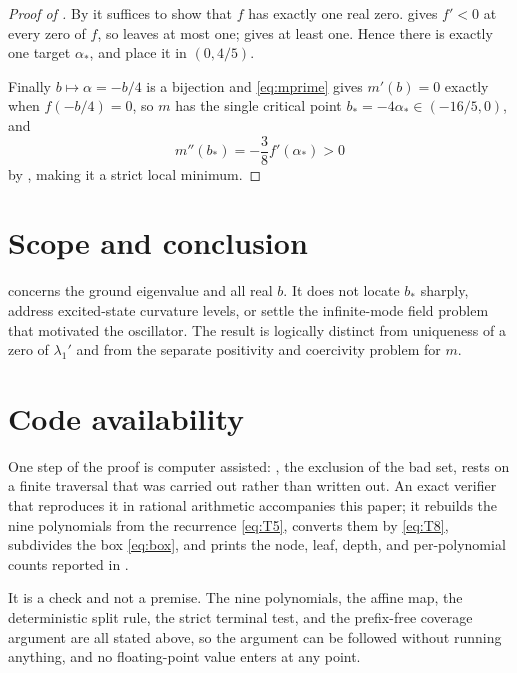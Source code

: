 \documentclass[11pt,reqno]{amsart}
\theoremstyle{plain}
\theoremstyle{definition}
\theoremstyle{remark}
\numberwithin{equation}{section}
\begin{document}
\begin{proof}[Proof of ]
  By  it suffices to show that $f$ has exactly one real
  zero.  gives $f'<0$ at every zero of $f$, so
   leaves at most one;  gives at
  least one. Hence there is exactly one target $\alpha_*$, and
   place it in $(0,4/5)$.

  Finally $b\mapsto\alpha=-b/4$ is a bijection and \eqref{eq:mprime} gives
  $m'(b)=0$ exactly when $f(-b/4)=0$, so $m$ has the single critical point
  $b_*=-4\alpha_*\in(-16/5,0)$, and
  \begin{equation*}
    m''(b_*)=-\frac38f'(\alpha_*)>0
  \end{equation*}
  by , making it a strict local minimum.
\end{proof}

\section{Scope and conclusion}

 concerns the ground eigenvalue and all real $b$.  It does
not locate $b_*$ sharply, address excited-state curvature levels, or settle
the infinite-mode field problem that motivated the oscillator.  The result
is logically distinct from uniqueness of a zero of $\lambda_1'$ and from
the separate positivity and coercivity problem for $m$.

\section*{Code availability}

One step of the proof is computer assisted: , the
exclusion of the bad set, rests on a finite traversal that was carried out
rather than written out. An exact verifier that reproduces it in rational
arithmetic accompanies this paper; it rebuilds the nine polynomials from the
recurrence \eqref{eq:T5}, converts them by \eqref{eq:T8}, subdivides the box
\eqref{eq:box}, and prints the node, leaf, depth, and per-polynomial counts
reported in .

It is a check and not a premise. The nine polynomials, the affine map, the
deterministic split rule, the strict terminal test, and the prefix-free
coverage argument are all stated above, so the argument can be followed
without running anything, and no floating-point value enters at any point.
\end{document}
